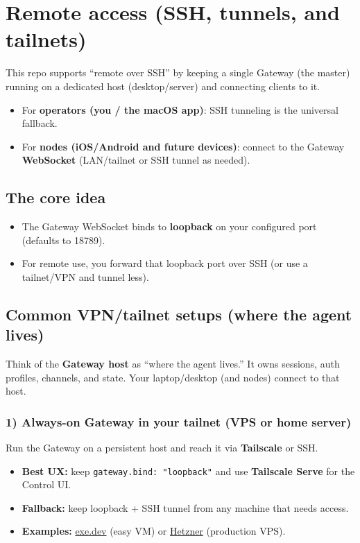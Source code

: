 \clearpage

\section{Remote access (SSH, tunnels, and tailnets)}


This repo supports “remote over SSH” by keeping a single Gateway (the master) running on a dedicated host (desktop/server) and connecting clients to it.

\begin{itemize}
  \item For \textbf{operators (you / the macOS app)}: SSH tunneling is the universal fallback.
  \item For \textbf{nodes (iOS/Android and future devices)}: connect to the Gateway \textbf{WebSocket} (LAN/tailnet or SSH tunnel as needed).
\end{itemize}


\subsection{The core idea}


\begin{itemize}
  \item The Gateway WebSocket binds to \textbf{loopback} on your configured port (defaults to 18789).
  \item For remote use, you forward that loopback port over SSH (or use a tailnet/VPN and tunnel less).
\end{itemize}


\subsection{Common VPN/tailnet setups (where the agent lives)}


Think of the \textbf{Gateway host} as “where the agent lives.” It owns sessions, auth profiles, channels, and state.
Your laptop/desktop (and nodes) connect to that host.

\subsubsection{1) Always-on Gateway in your tailnet (VPS or home server)}


Run the Gateway on a persistent host and reach it via \textbf{Tailscale} or SSH.

\begin{itemize}
  \item \textbf{Best UX:} keep \texttt{gateway.bind: "loopback"} and use \textbf{Tailscale Serve} for the Control UI.
  \item \textbf{Fallback:} keep loopback + SSH tunnel from any machine that needs access.
  \item \textbf{Examples:} \href{/install/exe-dev}{exe.dev} (easy VM) or \href{/install/hetzner}{Hetzner} (production VPS).
\end{itemize}


